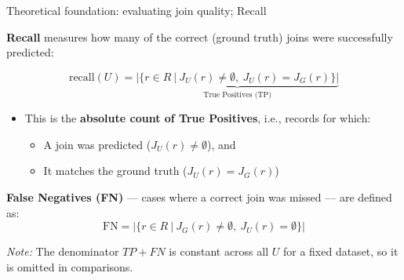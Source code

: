 \documentclass[8pt]{beamer} %
\begin{document}
\begin{frame}{Theoretical foundation: evaluating join quality; Recall}
	
	\textbf{Recall} measures how many of the correct (ground truth) joins were successfully predicted:
	
	$$
	\text{recall}(U) =
	\underbrace{|\{ r \in R\ |\ J_U(r) \neq \emptyset,\ J_U(r) = J_G(r) \}|}_{\text{True Positives (TP)}}
	$$
	
	\begin{itemize}
		\item This is the \textbf{absolute count of True Positives}, i.e., records for which:
		\begin{itemize}
			\item A join was predicted ($J_U(r) \neq \emptyset$), and
			\item It matches the ground truth ($J_U(r) = J_G(r)$)
		\end{itemize}
	\end{itemize}
	
	\vspace{0.5em}
	\textbf{False Negatives (FN)} — cases where a correct join was missed — are defined as:
	$$
	\text{FN} = |\{ r \in R\ |\ J_G(r) \neq \emptyset,\ J_U(r) = \emptyset \}|
	$$
	
	\textit{Note:} The denominator $TP + FN$ is constant across all $U$ for a fixed dataset, so it is omitted in comparisons.
	
\end{frame}
\end{document}
